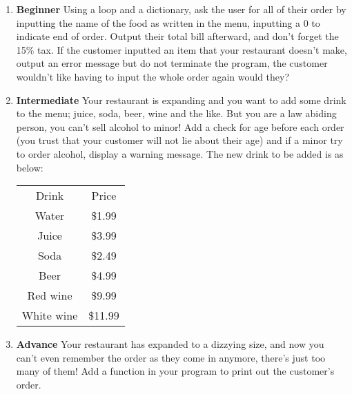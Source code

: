 \documentclass[12pt]{article}
\begin{document}
\begin{enumerate}[label=(\alph*)]
    \item \textbf{Beginner} Using a loop and a dictionary, ask the user for all of their order by inputting the name of the food as written in the menu, inputting a 0 to indicate end of order. Output their total bill afterward, and don't forget the 15\% tax. If the customer inputted an item that your restaurant doesn't make, output an error message but do not terminate the program, the customer wouldn't like having to input the whole order again would they?
    \item \textbf{Intermediate} Your restaurant is expanding and you want to add some drink to the menu; juice, soda, beer, wine and the like. But you are a law abiding person, you can't sell alcohol to minor! Add a check for age before each order (you trust that your customer will not lie about their age) and if a minor try to order alcohol, display a warning message. The new drink to be added is as below:
    \begin{table}[h!]
        \centering
        \begin{tabular}{c|c}
            Drink & Price \\
            \hhline{|=|=|}
            Water & \$1.99 \\
            Juice & \$3.99 \\
            Soda & \$2.49 \\
            Beer & \$4.99 \\
            Red wine & \$9.99 \\
            White wine & \$11.99
        \end{tabular}
    \end{table}
    
    \item \textbf{Advance} Your restaurant has expanded to a dizzying size, and now you can't even remember the order as they come in anymore, there's just too many of them! Add a function in your program to print out the customer's order.
\end{enumerate}
\end{document}
